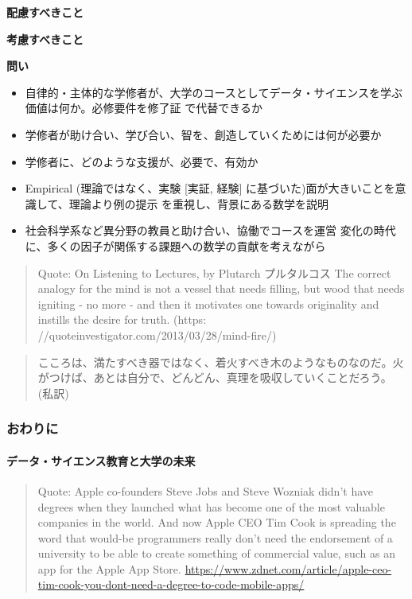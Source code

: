 \documentclass[
]{bxjsbook}
\providecommand{\tightlist}{%
  \setlength{\itemsep}{0pt}\setlength{\parskip}{0pt}}
\theoremstyle{definition}
\theoremstyle{definition}
\theoremstyle{definition}
\theoremstyle{definition}
\theoremstyle{remark}
\begin{document}
\textbf{配慮すべきこと}

\textbf{考慮すべきこと}

\textbf{問い}

\begin{itemize}
\tightlist
\item
  自律的・主体的な学修者が、大学のコースとしてデータ・サイエンスを学ぶ価値は何か。必修要件を修了証 で代替できるか
\item
  学修者が助け合い、学び合い、智を、創造していくためには何が必要か
\item
  学修者に、どのような支援が、必要で、有効か
\item
  Empirical (理論ではなく、実験 {[}実証, 経験{]} に基づいた)面が大きいことを意識して、理論より例の提示 を重視し、背景にある数学を説明
\item
  社会科学系など異分野の教員と助け合い、協働でコースを運営 変化の時代に、多くの因子が関係する課題への数学の貢献を考えながら
\end{itemize}

\begin{quote}
Quote: On Listening to Lectures, by Plutarch プルタルコス The correct analogy for the mind is not a vessel that needs filling, but wood that needs igniting - no more - and then it motivates one towards originality and instills the desire for truth. (https: //quoteinvestigator.com/2013/03/28/mind-fire/)
\end{quote}

\begin{quote}
こころは、満たすべき器ではなく、着火すべき木のようなものなのだ。火がつけば、あとは自分で、どんどん、真理を吸収していくことだろう。(私訳)
\end{quote}

\hypertarget{ux304aux308fux308aux306b}{%
\subsubsection{おわりに}\label{ux304aux308fux308aux306b}}

\hypertarget{ux30c7ux30fcux30bfux30b5ux30a4ux30a8ux30f3ux30b9ux6559ux80b2ux3068ux5927ux5b66ux306eux672aux6765}{%
\paragraph{データ・サイエンス教育と大学の未来}\label{ux30c7ux30fcux30bfux30b5ux30a4ux30a8ux30f3ux30b9ux6559ux80b2ux3068ux5927ux5b66ux306eux672aux6765}}

\begin{quote}
Quote: Apple co-founders Steve Jobs and Steve Wozniak didn't have degrees when they launched what has become one of the most valuable companies in the world.
And now Apple CEO Tim Cook is spreading the word that would-be programmers really don't need the endorsement of a university to be able to create something of commercial value, such as an app for the Apple App Store.
\url{https://www.zdnet.com/article/apple-ceo-tim-cook-you-dont-need-a-degree-to-code-mobile-apps/}
\end{quote}
\end{document}
